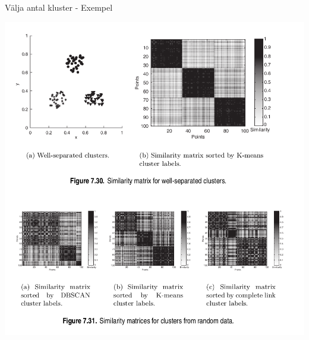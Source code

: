 \documentclass[10pt,english]{beamer}
\begin{document}
\begin{frame}{Välja antal kluster - Exempel}

    \includegraphics[width=.8\textwidth]{figs/Similarity matrices for clusters.png}
    
\end{frame}
\end{document}
